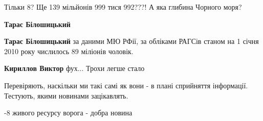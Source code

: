 \begin{itemize}
Тільки 8? Ще 139 мільйонів 999 тися 992???! А яка глибина Чорного моря?

\begin{itemize}
 
\textbf{Тарас Білошицький} 🤣🤣🤣🤣🔥🔥🔥

 
\textbf{Тарас Білошицький} за даними МЮ РФії, за обліками РАГСів станом на 1 січня 2010 року числилось 89 міліонів чоловік.

\begin{itemize}
 
\textbf{Кириллов Виктор} фух... Трохи легше стало
\end{itemize}

\end{itemize}

 
Перевіряють, наскільки ми такі самі як вони - в плані сприйняття інформації. Тестують, якими новинами зацікавлять.

 
-8 живого ресурсу ворога - добра новина

\begin{itemize}
 

\end{itemize}
\end{itemize}
